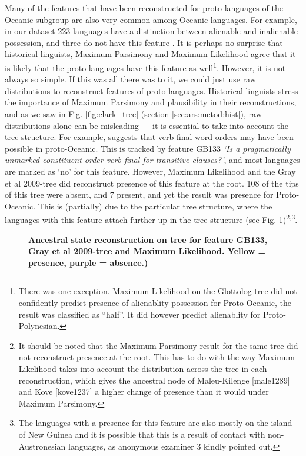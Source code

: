\documentclass[a4paper,10pt]{article} %
\begin{document}
Many of the features that have been reconstructed for proto-languages of the Oceanic subgroup are also very common among Oceanic languages. For example, in our dataset 223 languages have a distinction between alienable and inalienable possession, and three do not have this feature . It is perhaps no surprise that historical linguists, Maximum Parsimony and Maximum Likelihood  agree that it is likely that the proto-languages have this feature as well\footnote{There was one exception. Maximum Likelihood on the Glottolog tree did not confidently predict presence of alienablity possession for Proto-Oceanic, the result was classified as ``half''. It did however predict alienablity for Proto-Polynesian.}. However, it is not always so simple. If this was all there was to it, we could just use raw distributions to reconstruct features of proto-languages. Historical linguists stress the importance of Maximum Parsimony and plausibility in their reconstructions, and as we saw in Fig. \ref{fig:clark_tree} (section \ref{sec:ars:metod:hist}), raw distributions alone can be misleading --- it is essential to take into account the tree structure. For example, \citet[118]{pawley1973some} suggests that verb-final word orders may have been possible in proto-Oceanic. This is tracked by feature GB133 \emph{`Is a pragmatically unmarked constituent order verb-final for transitive clauses?'}, and most languages are marked as `no' for this feature. However, Maximum Likelihood and the Gray et al 2009-tree did reconstruct presence of this feature at the root. 108 of the tips of this tree were absent, and 7 present, and yet the result was presence for Proto-Oceanic. This is (partially) due to the particular tree structure, where the languages with this feature attach further up in the tree structure (see Fig. \ref{GB133_tree_ML_gray})\footnote{It should be noted that the Maximum Parsimony result for the same tree did not reconstruct presence at the root. This has to do with the way Maximum Likelihood takes into account the distribution across the tree in each reconstruction, which gives the ancestral node of Maleu-Kilenge [male1289] and Kove [kove1237] a higher change of presence than it would under Maximum Parsimony.}\textsuperscript{,}\footnote{The languages with a presence for this feature are also mostly on the island of New Guinea and it is possible that this is a result of contact with non-Austronesian languages, as anonymous examiner 3 kindly pointed out.}.

\newpage
\begin{figure}
\centering
\caption[Ancestral state reconstruction on tree for feature GB133, Gray et al 2009-tree and Maximum Likelihood.]{\textbf{Ancestral state reconstruction on tree for feature GB133, Gray et al 2009-tree and Maximum Likelihood. Yellow = presence, purple = absence.)}}
\label{GB133_tree_ML_gray}
\end{figure}
\end{document}
